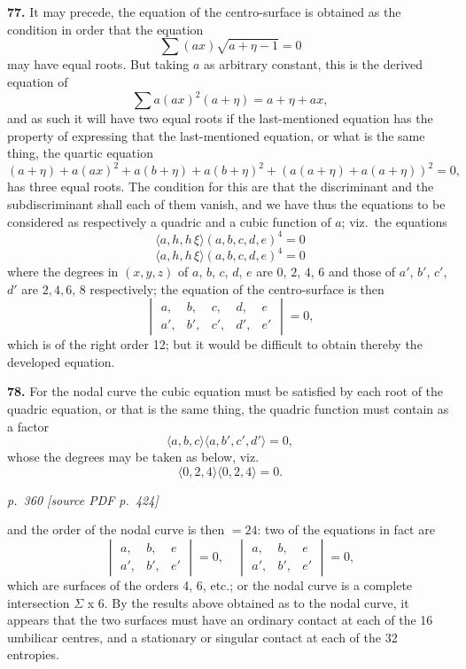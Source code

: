 \documentclass[11pt,a4paper]{article}
\newcommand{\pagemarker}[2]{\par\bigskip\noindent\textit{p.~#1 [source PDF p.~#2]}\par\smallskip}
\begin{document}
\textbf{77.} It may precede, the equation of the centro-surface is obtained as the condition in order that the equation
\[
\sum(a x)\sqrt{a + \eta - 1} = 0
\]
may have equal roots. But taking $a$ as arbitrary constant, this is the derived equation of
\[
\sum a (a x)^2 (a + \eta) = a + \eta + a x,
\]
and as such it will have two equal roots if the last-mentioned equation has the property of expressing that the last-mentioned equation, or what is the same thing, the quartic equation
\[
(a + \eta) + a (a x)^2 + a (b + \eta) + a (b + \eta)^2 + (a (a + \eta) + a (a + \eta))^2 = 0,
\]
has three equal roots. The condition for this are that the discriminant and the subdiscriminant shall each of them vanish, and we have thus the equations to be considered as respectively a quadric and a cubic function of $a$; viz.\ the equations
\[
\langle a, h, h\,\xi \rangle (a, b, c, d, e)^4 = 0
\]
\[
\langle a, h, h\,\xi \rangle (a, b, c, d, e)^4 = 0
\]
where the degrees in $(x, y, z)$ of $a$, $b$, $c$, $d$, $e$ are $0$, $2$, $4$, $6$ and those of $a'$, $b'$, $c'$, $d'$ are $2, 4, 6$, $8$ respectively; the equation of the centro-surface is then
\[
\begin{vmatrix} a, & b, & c, & d, & e \\
a', & b', & c', & d', & e' \end{vmatrix} = 0,
\]
which is of the right order 12; but it would be difficult to obtain thereby the developed equation.

\textbf{78.} For the nodal curve the cubic equation must be satisfied by each root of the quadric equation, or that is the same thing, the quadric function must contain as a factor
\[
\langle a, b, c \rangle \langle a, b', c', d' \rangle = 0,
\]
whose the degrees may be taken as below, viz.
\[
\langle 0, 2, 4 \rangle \langle 0, 2, 4 \rangle = 0.
\]

\clearpage

\bigskip
\pagemarker{360}{424}
\smallskip

and the order of the nodal curve is then $= 24$: two of the equations in fact are
\[
\begin{vmatrix} a, & b, & e \\
a', & b', & e' \end{vmatrix} = 0,\quad \begin{vmatrix} a, & b, & e \\
a', & b', & e' \end{vmatrix} = 0,
\]
which are surfaces of the orders 4, 6, etc.; or the nodal curve is a complete intersection $\Sigma$ x 6. By the results above obtained as to the nodal curve, it appears that the two surfaces must have an ordinary contact at each of the 16 umbilicar centres, and a stationary or singular contact at each of the 32 entropies.
\end{document}
